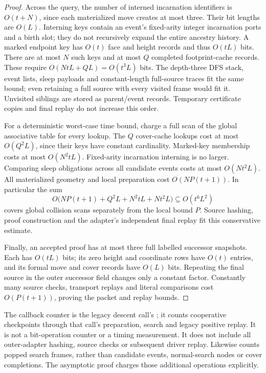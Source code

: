 \begin{proof}
Across the query, the number of interned incarnation identifiers is
$O(t+N)$, since each materialized move creates at most three.  Their
bit lengths are $O(L)$.  Interning keys contain an event's fixed-arity
integer incarnation ports and a birth slot; they do not recursively
expand the entire ancestry history.  A marked endpoint key has $O(t)$
face and height records and thus $O(tL)$ bits.  There are at most $N$
such keys and at most $Q$ completed footprint-cache records.  These
require $O(NtL+QL)=O(t^3L)$ bits.  The depth-three DFS stack, event lists,
sleep payloads and constant-length full-source traces fit the same
bound; even retaining a full source with every visited frame would fit
it.  Unvisited siblings are stored as parent/event records.  Temporary
certificate copies and final replay do not increase this order.

For a deterministic worst-case time bound, charge a full scan of the
global associative table for every lookup.  The $Q$ cover-cache
lookups cost at most $O(Q^2L)$, since their keys have constant
cardinality.  Marked-key membership costs at most $O(N^2tL)$.
Fixed-arity incarnation interning is no larger.  Comparing sleep
obligations across all candidate events costs at most $O(Nt^2L)$.
All materialized geometry and local preparation cost $O(NP(t+1))$.
In particular the sum
\[
 O\bigl(NP(t+1)+Q^2L+N^2tL+Nt^2L\bigr)
                \subseteq O(t^6L^2)
\]
covers global collision scans separately from the local bound $P$.
Source hashing, proof construction and the adapter's independent final
replay fit this conservative estimate.

Finally, an accepted proof has at most three full labelled successor
snapshots.  Each has $O(tL)$ bits; its zero height and coordinate rows
have $O(t)$ entries, and its formal move and cover records have
$O(L)$ bits.  Repeating the final source in the outer successor field
changes only a constant factor.  Constantly many source checks,
transport replays and literal comparisons cost $O(P(t+1))$, proving
the packet and replay bounds.
\end{proof}

The callback counter  is the legacy descent call's
; it counts cooperative checkpoints through that
call's preparation, search and legacy positive replay.  It is not a
bit-operation counter or a timing measurement.  It does not include
all outer-adapter hashing, source checks or subsequent driver replay.
Likewise  counts popped search frames, rather than
candidate events, normal-search nodes or cover completions.  The
asymptotic proof charges those additional operations explicitly.

